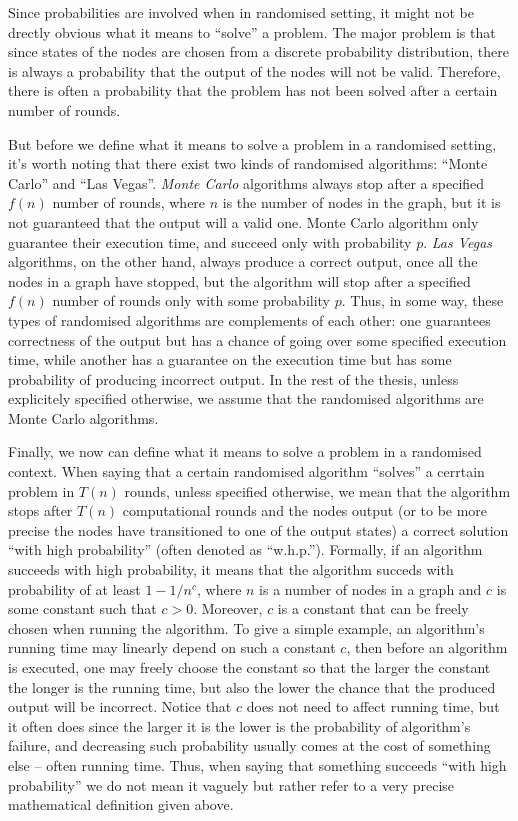 Since probabilities are involved when in randomised setting, it might not be
drectly obvious what it means to ``solve'' a problem. The major problem is that
since states of the nodes are chosen from a discrete probability distribution,
there is always a probability that the output of the nodes will not be valid.
Therefore, there is often a probability that the problem has not been solved
after a certain number of rounds.

But before we define what it means to solve a problem in a randomised setting, it's
worth noting that there exist two kinds of randomised algorithms: ``Monte Carlo'' and
``Las Vegas''. \emph{Monte Carlo} algorithms always stop after a specified $f(n)$
number of rounds, where $n$ is the number of nodes in the graph, but
it is not guaranteed that the output will a valid one. Monte Carlo algorithm
only guarantee their execution time, and succeed only with probability $p$.
\emph{Las Vegas} algorithms, on the other hand, always produce a correct output,
once all the nodes in a graph have stopped, but the algorithm will stop after a
specified $f(n)$ number of rounds only with some probability $p$. Thus, in some
way, these types of randomised algorithms are complements of each other:
one guarantees correctness of the output but has a chance of going over some
specified execution time, while another has a guarantee on the execution time
but has some probability of producing incorrect output. In the rest of the thesis,
unless explicitely specified otherwise, we assume that the randomised algorithms
are Monte Carlo algorithms.

Finally, we now can define what it means to solve a problem in a randomised context.
When saying that a certain randomised algorithm ``solves'' a cerrtain problem in
$T(n)$ rounds, unless specified otherwise, we mean that the algorithm stops after
$T(n)$ computational rounds and the nodes output (or to be more precise the nodes
have transitioned to one of the output states) a correct solution ``with high
probability'' (often denoted as ``w.h.p.''). Formally, if an algorithm succeeds with
high probability, it means that the algorithm succeds with probability of at least
$1 - 1 / n^c$, where $n$ is a number of nodes in a graph and $c$ is some constant
such that $c > 0$. Moreover, $c$ is a constant that can be freely chosen when 
running the algorithm. To give a simple example, an algorithm's running time may
linearly depend on such a constant $c$, then before an algorithm is executed,
one may freely choose the constant so that the larger the constant the longer is
the running time, but also the lower the chance that the produced output will
be incorrect. Notice that $c$ does not need to affect running time, but it often
does since the larger it is the lower is the probability of algorithm's failure,
and decreasing such probability usually comes at the cost of something else -- 
often running time. Thus, when saying that something succeeds ``with high probability''
we do not mean it vaguely but rather refer to a very precise mathematical definition
given above.


